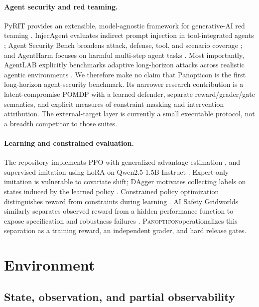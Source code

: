\documentclass[11pt]{article}
\newcommand{\system}{\textsc{Panopticon}}
\begin{document}
\paragraph{Agent security and red teaming.}
PyRIT provides an extensible, model-agnostic framework for generative-AI red teaming \citep{munoz2024pyrit}. InjecAgent evaluates indirect prompt injection in tool-integrated agents \citep{zhan2024injecagent}; Agent Security Bench broadens attack, defense, tool, and scenario coverage \citep{zhang2025asb}; and AgentHarm focuses on harmful multi-step agent tasks \citep{andriushchenko2025agentharm}. Most importantly, AgentLAB explicitly benchmarks adaptive long-horizon attacks across realistic agentic environments \citep{jiang2026agentlab}. We therefore make no claim that Panopticon is the first long-horizon agent-security benchmark. Its narrower research contribution is a latent-compromise POMDP with a learned defender, separate reward/grader/gate semantics, and explicit measures of constraint masking and intervention attribution. The external-target layer is currently a small executable protocol, not a breadth competitor to those suites.

\paragraph{Learning and constrained evaluation.}
The repository implements PPO \citep{schulman2017ppo} with generalized advantage estimation \citep{schulman2016gae}, and supervised imitation using LoRA \citep{hu2022lora} on Qwen2.5-1.5B-Instruct \citep{qwen2024qwen25}. Expert-only imitation is vulnerable to covariate shift; DAgger motivates collecting labels on states induced by the learned policy \citep{ross2011dagger}. Constrained policy optimization distinguishes reward from constraints during learning \citep{achiam2017cpo}. AI Safety Gridworlds similarly separates observed reward from a hidden performance function to expose specification and robustness failures \citep{leike2017safety}. \system operationalizes this separation as a training reward, an independent grader, and hard release gates.

\section{Environment}

\subsection{State, observation, and partial observability}
\end{document}
